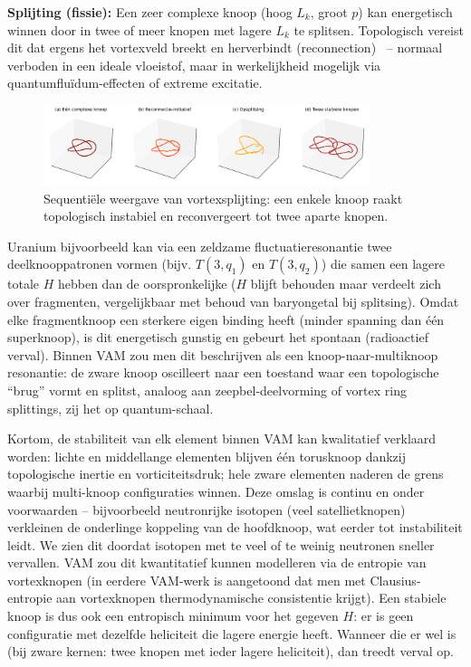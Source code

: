 \textbf{Splijting (fissie):} Een zeer complexe knoop (hoog $L_k$, groot $p$) kan energetisch winnen door in twee of meer knopen met lagere $L_k$
te splitsen. Topologisch vereist dit dat ergens het vortexveld breekt en herverbindt (reconnection)~\cite{Kleckner2013KnotsVortex} – normaal verboden in een ideale vloeistof, maar in werkelijkheid mogelijk via quantumfluïdum-effecten of extreme excitatie.
\begin{figure}[H]
    \centering
    \includegraphics[width=0.85\textwidth]{sections/7_Slijten_Verbinden}
    \caption{Sequentiële weergave van vortexsplijting: een enkele knoop raakt topologisch instabiel en reconvergeert tot twee aparte knopen.}
    \label{fig:reconnectie_splijting}
\end{figure}

Uranium bijvoorbeeld kan via een zeldzame fluctuatieresonantie twee deelknooppatronen vormen (bijv. $T(3,q_1)$ en $T(3,q_2)$) die samen een lagere totale $H$ hebben dan de oorspronkelijke ($H$ blijft behouden maar verdeelt zich over fragmenten, vergelijkbaar met behoud van baryongetal bij splitsing). Omdat elke fragmentknoop een sterkere eigen binding heeft (minder spanning dan één superknoop), is dit energetisch gunstig en gebeurt het spontaan (radioactief verval). Binnen VAM zou men dit beschrijven als een knoop-naar-multiknoop resonantie: de zware knoop oscilleert naar een toestand waar een topologische “brug” vormt en splitst, analoog aan zeepbel-deelvorming of vortex ring splittings, zij het op quantum-schaal.

Kortom, de stabiliteit van elk element binnen VAM kan kwalitatief verklaard worden: lichte en middellange elementen blijven één torusknoop dankzij topologische inertie en vorticiteitsdruk; hele zware elementen naderen de grens waarbij multi-knoop configuraties winnen. Deze omslag is continu en onder voorwaarden – bijvoorbeeld neutronrijke isotopen (veel satellietknopen) verkleinen de onderlinge koppeling van de hoofdknoop, wat eerder tot instabiliteit leidt. We zien dit doordat isotopen met te veel of te weinig neutronen sneller vervallen. VAM zou dit kwantitatief kunnen modelleren via de entropie van vortexknopen (in eerdere VAM-werk is aangetoond dat men met Clausius-entropie aan vortexknopen thermodynamische consistentie krijgt). Een stabiele knoop is dus ook een entropisch minimum voor het gegeven $H$: er is geen configuratie met dezelfde heliciteit die lagere energie heeft. Wanneer die er wel is (bij zware kernen: twee knopen met ieder lagere heliciteit), dan treedt verval op.